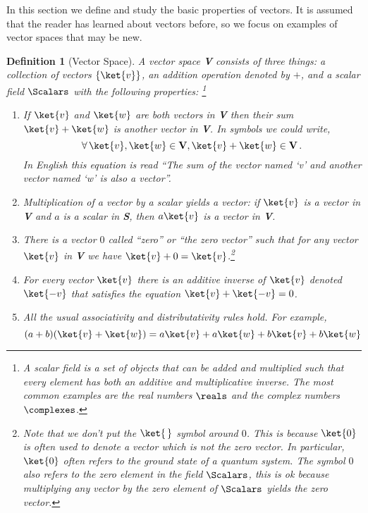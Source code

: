
In this section we define and study the basic properties of vectors.
It is assumed that the reader has learned about vectors before, so we focus on examples of vector spaces that may be new.


\newtheorem{definition}{Definition}
\begin{definition}[Vector Space]
A vector space \textbf{V} consists of three things: a collection of vectors $\{\ket{v}\}$, an addition operation denoted by $+$, and a scalar field $\Scalars$ with the following properties: \footnote{A scalar field is a set of objects that can be added and multiplied such that every element has both an additive and multiplicative inverse.
The most common examples are the real numbers $\reals$ and the complex numbers $\complexes$.}
\begin{enumerate}
  \item If $\ket{v}$ and $\ket{w}$ are both vectors in \textbf{V} then their sum $\ket{v} + \ket{w}$ is another vector in \textbf{V}.
In symbols we could write,
  \begin{equation*}
    \forall \, \ket{v}, \ket{w} \in \textbf{V}, \ket{v} + \ket{w} \in \textbf{V} \, .
  \end{equation*}
  In English this equation is read ``The sum of the vector named `v' and another vector named `w' is also a vector''.

  \item Multiplication of a vector by a scalar yields a vector: if $\ket{v}$ is a vector in \textbf{V} and $a$ is a scalar in \textbf{S}, then $a\ket{v}$ is a vector in \textbf{V}.

  \item There is a vector $0$ called ``zero'' or ``the zero vector'' such that for any vector $\ket{v}$ in \textbf{V} we have $\ket{v} + 0 = \ket{v}$.\footnote{Note that we don't put the $\ket{\,}$ symbol around $0$.
  This is because $\ket{0}$ is often used to denote a vector which is not the zero vector.
  In particular, $\ket{0}$ often refers to the ground state of a quantum system.
  The symbol $0$ also refers to the zero element in the field $\Scalars$, this is ok because multiplying any vector by the zero element of $\Scalars$ yields the zero vector.}

  \item For every vector $\ket{v}$ there is an additive inverse of $\ket{v}$ denoted $\ket{-v}$ that satisfies the equation $\ket{v} + \ket{-v} = 0$.

  \item All the usual associativity and distributativity rules hold.
  For example,
  \begin{equation*}
    (a+b)(\ket{v} + \ket{w}) = a\ket{v} + a\ket{w} + b\ket{v} + b\ket{w}
  \end{equation*}
\end{enumerate}
\end{definition}

